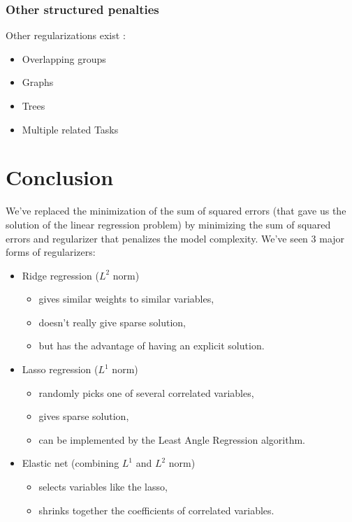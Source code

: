 \documentclass[a4paper,12pt]{article}
\begin{document}
\subsubsection{Other structured penalties}
Other regularizations exist :
\begin{itemize}
\item Overlapping groups
\item Graphs
\item Trees
\item Multiple related Tasks
\end{itemize}

\section{Conclusion}
We've replaced the minimization of the sum of squared errors (that gave us the solution of the linear regression problem) by minimizing the sum of squared errors and regularizer that penalizes the model complexity. We've seen 3 major forms of regularizers:
\begin{itemize}
\item Ridge regression ($L^2$ norm)
	\begin{itemize}
	\item gives similar weights to similar variables,
	\item doesn't really give sparse solution,
	\item but has the advantage of having an explicit solution.
	\end{itemize}
\item Lasso regression ($L^1$ norm)
	\begin{itemize}
	\item randomly picks one of several correlated variables,
	\item gives sparse solution,
	\item can be implemented by the Least Angle Regression algorithm.
	\end{itemize}
\item Elastic net (combining $L^1$ and $L^2$ norm)
	\begin{itemize}
	\item selects variables like the lasso,
	\item shrinks together the coefficients of correlated variables.
	\end{itemize}
\end{itemize}
\end{document}
